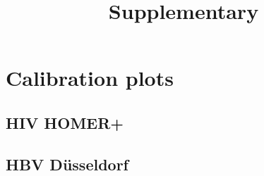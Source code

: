 \documentclass[a4paper,11pt]{article}
\author{}
\date{}
\title{Supplementary}
\begin{document}
\maketitle

%
\section*{Calibration plots}

\FloatBarrier
\subsection*{HIV HOMER+}
  
  

\FloatBarrier
\subsection*{HBV Düsseldorf}

  
\end{document}
